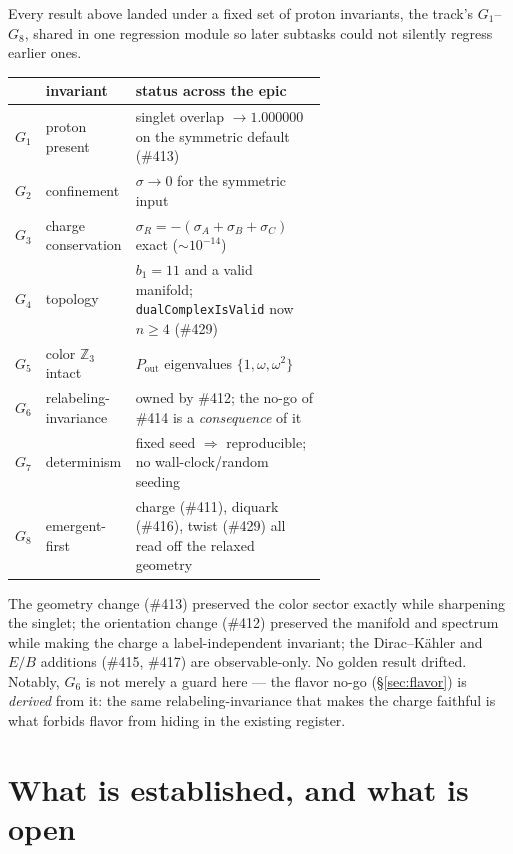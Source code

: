 \documentclass[11pt]{article}
\theoremstyle{definition}
\newcommand{\Z}{\mathbb{Z}}
\newcommand{\sigmacol}{\sigma}
\newcommand{\Pout}{P_{\mathrm{out}}}
\newcommand{\code}[1]{\texttt{#1}}
\begin{document}
Every result above landed under a fixed set of proton invariants, the track's
$G_1$--$G_8$, shared in one regression module so later subtasks could not silently regress
earlier ones.

\begin{center}
\small
\setlength{\tabcolsep}{5pt}
\begin{tabular}{@{}clp{0.62\linewidth}@{}}
\toprule
 & invariant & status across the epic\\
\midrule
$G_1$ & proton present & singlet overlap $\to 1.000000$ on the symmetric default (\#413)\\
$G_2$ & confinement & $\sigmacol\to0$ for the symmetric input\\
$G_3$ & charge conservation & $\sigmacol_R=-(\sigmacol_A+\sigmacol_B+\sigmacol_C)$ exact ($\sim10^{-14}$)\\
$G_4$ & topology & $b_1=11$ and a valid manifold; \code{dualComplexIsValid} now $n\ge4$ (\#429)\\
$G_5$ & color $\Z_3$ intact & $\Pout$ eigenvalues $\{1,\omega,\omega^2\}$\\
$G_6$ & relabeling-invariance & owned by \#412; the no-go of \#414 is a \emph{consequence} of it\\
$G_7$ & determinism & fixed seed $\Rightarrow$ reproducible; no wall-clock/random seeding\\
$G_8$ & emergent-first & charge (\#411), diquark (\#416), twist (\#429) all read off the relaxed geometry\\
\bottomrule
\end{tabular}
\end{center}

\noindent The geometry change (\#413) preserved the color sector exactly while sharpening
the singlet; the orientation change (\#412) preserved the manifold and spectrum while
making the charge a label-independent invariant; the Dirac--K\"ahler and $E/B$ additions
(\#415, \#417) are observable-only. No golden result drifted. Notably, $G_6$ is not merely
a guard here --- the flavor no-go (\S\ref{sec:flavor}) is \emph{derived} from it: the same
relabeling-invariance that makes the charge faithful is what forbids flavor from hiding in
the existing register.

\section{What is established, and what is open}
\label{sec:assess}
\end{document}
